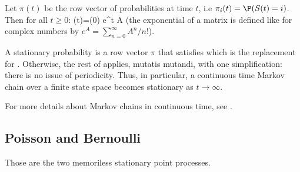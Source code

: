Let $\pi(t)$ be the row vector of probabilities at time $t$,
i.e $\pi_i(t)=\P(S(t)=i)$. Then for all $t \geq 0$:
 \be
\pi(t)=\pi(0) e^{t A}\label{eq-trans-con}
 \ee
(the exponential of a matrix is defined like for complex numbers by
$e^{A}=\sum_{n=0}^{\infty} A^n/n!$).

A stationary probability is a row vector $\pi$ that satisfies
 \be
 \label{eq-proba-stat-cont}
 \ee
 which is the replacement for . Otherwise, the rest of  applies, mutatis
 mutandi, with one simplification: there is no issue of
 periodicity. Thus, in particular, a continuous time Markov
 chain over a finite state space becomes stationary as $t \to
 \infty$.


 For more details about Markov chains in continuous time, see
 \cite{serfozo1999introduction}.
%
%
%
%
\subsection{Poisson and Bernoulli}
Those are the two memoriless stationary point processes.

